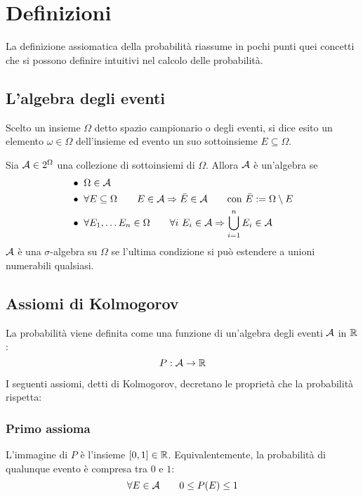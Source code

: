\section{Definizioni}
La definizione assiomatica della probabilità riassume in pochi punti quei concetti che si possono definire intuitivi nel calcolo delle probabilità.



\subsection{L'algebra degli eventi}
\begin{defin}
	Scelto un insieme $\Omega$ detto spazio campionario o degli eventi, si dice esito un elemento $\omega\in\Omega$ dell'insieme ed evento un suo sottoinsieme $E\subseteq\Omega$.

\end{defin}
\begin{defin}
	Sia $\mathcal A\in2^\Omega$ una collezione di sottoinsiemi di $\Omega$. Allora $\mathcal A$ è un'algebra se
	\begin{align*}
		 & \bullet ~ \Omega\in \mathcal A                                                                                            \\
		 & \bullet ~ \forall E\subseteq\Omega\qquad E\in\mathcal A\Rightarrow \bar E\in\mathcal A \qquad\text{con }\bar E:=\Omega\setminus E \\
		 & \bullet ~ \forall E_1,\dots E_n\in\Omega\qquad \forall i~E_i\in\mathcal A\Rightarrow \bigcup\limits_{i=1}^n E_i \in\mathcal A
	\end{align*}
	$\mathcal A$ è una $\sigma$-algebra su $\Omega$ se l'ultima condizione si può estendere a unioni numerabili qualsiasi.
\end{defin}




\subsection{Assiomi di Kolmogorov}
La probabilità viene definita come una funzione di un'algebra degli eventi $\mathcal A$ in $\mathbb R$:
\begin{equation*}
	P:\mathcal A\to\mathbb R
\end{equation*}

I seguenti assiomi, detti di Kolmogorov, decretano le proprietà che la probabilità rispetta:


\subsubsection{Primo assioma}
L'immagine di $P$ è l'insieme $[0,1]\in\mathbb R$. Equivalentemente, la probabilità di qualunque evento è compresa tra $0$ e $1$:
\begin{equation*}
	\forall E\in\mathcal A\qquad 0\leq P(E)\leq 1
\end{equation*}


